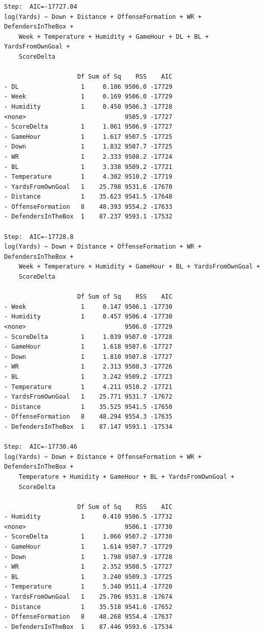 \documentclass[
  super,
  preprint,
  3p]{elsarticle}
\begin{document}
\begin{verbatim}
Step:  AIC=-17727.04
log(Yards) ~ Down + Distance + OffenseFormation + WR + DefendersInTheBox + 
    Week + Temperature + Humidity + GameHour + DL + BL + YardsFromOwnGoal + 
    ScoreDelta

                    Df Sum of Sq    RSS    AIC
- DL                 1     0.106 9506.0 -17729
- Week               1     0.169 9506.0 -17729
- Humidity           1     0.450 9506.3 -17728
<none>                           9505.9 -17727
- ScoreDelta         1     1.061 9506.9 -17727
- GameHour           1     1.617 9507.5 -17725
- Down               1     1.832 9507.7 -17725
- WR                 1     2.333 9508.2 -17724
- BL                 1     3.338 9509.2 -17721
- Temperature        1     4.302 9510.2 -17719
- YardsFromOwnGoal   1    25.798 9531.6 -17670
- Distance           1    35.623 9541.5 -17648
- OffenseFormation   8    48.393 9554.2 -17633
- DefendersInTheBox  1    87.237 9593.1 -17532

Step:  AIC=-17728.8
log(Yards) ~ Down + Distance + OffenseFormation + WR + DefendersInTheBox + 
    Week + Temperature + Humidity + GameHour + BL + YardsFromOwnGoal + 
    ScoreDelta

                    Df Sum of Sq    RSS    AIC
- Week               1     0.147 9506.1 -17730
- Humidity           1     0.457 9506.4 -17730
<none>                           9506.0 -17729
- ScoreDelta         1     1.039 9507.0 -17728
- GameHour           1     1.618 9507.6 -17727
- Down               1     1.810 9507.8 -17727
- WR                 1     2.313 9508.3 -17726
- BL                 1     3.242 9509.2 -17723
- Temperature        1     4.211 9510.2 -17721
- YardsFromOwnGoal   1    25.771 9531.7 -17672
- Distance           1    35.525 9541.5 -17650
- OffenseFormation   8    48.294 9554.3 -17635
- DefendersInTheBox  1    87.147 9593.1 -17534

Step:  AIC=-17730.46
log(Yards) ~ Down + Distance + OffenseFormation + WR + DefendersInTheBox + 
    Temperature + Humidity + GameHour + BL + YardsFromOwnGoal + 
    ScoreDelta

                    Df Sum of Sq    RSS    AIC
- Humidity           1     0.410 9506.5 -17732
<none>                           9506.1 -17730
- ScoreDelta         1     1.066 9507.2 -17730
- GameHour           1     1.614 9507.7 -17729
- Down               1     1.798 9507.9 -17728
- WR                 1     2.352 9508.5 -17727
- BL                 1     3.240 9509.3 -17725
- Temperature        1     5.340 9511.4 -17720
- YardsFromOwnGoal   1    25.706 9531.8 -17674
- Distance           1    35.518 9541.6 -17652
- OffenseFormation   8    48.268 9554.4 -17637
- DefendersInTheBox  1    87.446 9593.6 -17534


\end{verbatim}
\end{document}
